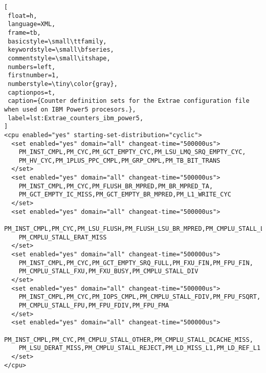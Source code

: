 \begin{lstlisting}[
 float=h,
 language=XML,
 frame=tb,
 basicstyle=\small\ttfamily,
 keywordstyle=\small\bfseries,
 commentstyle=\small\itshape,
 numbers=left,
 firstnumber=1,
 numberstyle=\tiny\color{gray},
 captionpos=t,
 caption={Counter definition sets for the Extrae configuration file when used on IBM Power5 procesors.},
 label=lst:Extrae_counters_ibm_power5,
]
<cpu enabled="yes" starting-set-distribution="cyclic">
  <set enabled="yes" domain="all" changeat-time="500000us">
    PM_INST_CMPL,PM_CYC,PM_GCT_EMPTY_CYC,PM_LSU_LMQ_SRQ_EMPTY_CYC,
    PM_HV_CYC,PM_1PLUS_PPC_CMPL,PM_GRP_CMPL,PM_TB_BIT_TRANS
  </set>
  <set enabled="yes" domain="all" changeat-time="500000us">
    PM_INST_CMPL,PM_CYC,PM_FLUSH_BR_MPRED,PM_BR_MPRED_TA,
    PM_GCT_EMPTY_IC_MISS,PM_GCT_EMPTY_BR_MPRED,PM_L1_WRITE_CYC
  </set>
  <set enabled="yes" domain="all" changeat-time="500000us">
    PM_INST_CMPL,PM_CYC,PM_LSU_FLUSH,PM_FLUSH_LSU_BR_MPRED,PM_CMPLU_STALL_LSU,
    PM_CMPLU_STALL_ERAT_MISS
  </set>
  <set enabled="yes" domain="all" changeat-time="500000us">
    PM_INST_CMPL,PM_CYC,PM_GCT_EMPTY_SRQ_FULL,PM_FXU_FIN,PM_FPU_FIN,
    PM_CMPLU_STALL_FXU,PM_FXU_BUSY,PM_CMPLU_STALL_DIV 
  </set>
  <set enabled="yes" domain="all" changeat-time="500000us">
    PM_INST_CMPL,PM_CYC,PM_IOPS_CMPL,PM_CMPLU_STALL_FDIV,PM_FPU_FSQRT,
    PM_CMPLU_STALL_FPU,PM_FPU_FDIV,PM_FPU_FMA
  </set>
  <set enabled="yes" domain="all" changeat-time="500000us">
    PM_INST_CMPL,PM_CYC,PM_CMPLU_STALL_OTHER,PM_CMPLU_STALL_DCACHE_MISS,
    PM_LSU_DERAT_MISS,PM_CMPLU_STALL_REJECT,PM_LD_MISS_L1,PM_LD_REF_L1
  </set>
</cpu>

\end{lstlisting}
